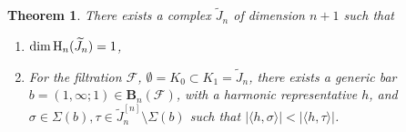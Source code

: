 \documentclass[11pt]{amsart}
\theoremstyle{theorem}
\newtheorem{theorem}{Theorem}
\theoremstyle{remark}
\theoremstyle{definition}
\newcommand{\HH}  {\mbox{\rm H}}
\newcommand{\hide}[1]{}
\newcommand{\FF}{\mathcal{F}}
\begin{document}
\begin{theorem}
\label{thm:counter-example}
    There exists a complex $\widetilde{J}_n$ of dimension $n+1$ such that
    \begin{enumerate}
        \item $\dim \HH_n(\widetilde{J}_n) = 1$,
        
        \item For the filtration $\FF$, $\emptyset = K_0  \subset K_1 = \widetilde{J}_n$, there exists a generic bar $b=(1,\infty;1) \in \mathbf{B}_n(\FF)$, with a harmonic representative $h$, and $\sigma \in \Sigma(b), \tau \in \widetilde{J}^{[n]}_n \setminus \Sigma(b)$ 
        such that $|\langle h, \sigma \rangle| < |\langle h,\tau \rangle|$.
        \hide{
        For a harmonic representative $h$,  there exist simplices $\sigma\perp B$ and $\tau\not\perp B$, where $B$ is the space of $n$-dimensional boundaries, such that $|\langle h, \sigma \rangle| < |\langle h,\tau \rangle|$.
        }
    \end{enumerate}
\end{theorem}
\end{document}

